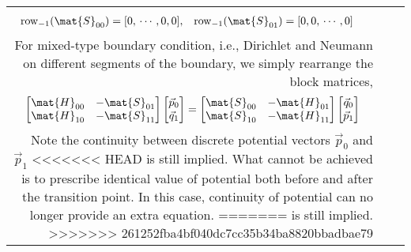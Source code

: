 \documentclass{jfm}
\begin{document}
\begin{table}
\begin{center}
\begin{tabular}{rl|l}
\begin{equation}
\begin{aligned}
\mathrm{row}_{-1}(\mat{S}_{00}) &= [0, \,\cdots ,0 , 0],&
\mathrm{row}_{-1}(\mat{S}_{01}) &= [0,0, \,\cdots ,0 ]
\end{aligned}\end{equation}
For mixed-type boundary condition, i.e., Dirichlet and Neumann on different segments of the boundary,
we simply rearrange the block matrices,
\begin{equation}
\begin{bmatrix}
\mat{H}_{00}&-\mat{S}_{01}\\\mat{H}_{10}&-\mat{S}_{11}
\end{bmatrix}
\begin{bmatrix}
\vec{p}_0\\\vec{q}_1
\end{bmatrix}
=\begin{bmatrix}
\mat{S}_{00}&-\mat{H}_{01}\\\mat{S}_{10}&-\mat{H}_{11}
\end{bmatrix}
\begin{bmatrix}
\vec{q}_0\\\vec{p}_1
\end{bmatrix}
\end{equation}
Note the continuity between discrete potential vectors $\vec{p}_0$ and $\vec{p}_1$
<<<<<<< HEAD
is still implied. What cannot be achieved is to prescribe identical value of potential both before and after the transition point.
In this case, continuity of potential can no longer provide an extra equation.
=======
is still implied.
>>>>>>> 261252fba4bf040dc7cc35b34ba8820bbadbae79


\end{tabular}
\end{center}
\end{table}
\end{document}
